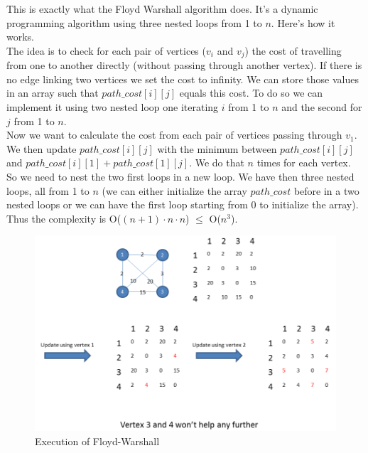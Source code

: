 This is exactly what the Floyd Warshall algorithm does. It's a dynamic programming algorithm using three nested loops from 1 to $n$. Here's how it works.\\

The idea is to check for each pair of vertices ($v_i$ and $v_j$) the cost of travelling from one to another directly (without passing through another vertex). If there is no edge linking two vertices we set the cost to infinity. We can store those values in an array such that $path\_cost[i][j]$ equals this cost. To do so we can implement it using two nested loop one iterating $i$ from 1 to $n$ and the second for $j$ from 1 to $n$.\\
Now we want to calculate the cost from each pair of vertices passing through $v_1$. We then update $path\_cost[i][j]$ with the minimum between $path\_cost[i][j]$ and $path\_cost[i][1]+path\_cost[1][j]$. We do that $n$ times for each vertex. So we need to nest the two first loops in a new loop. We have then three nested loops, all from 1 to $n$ (we can either initialize the array $path\_cost$ before in a two nested loops or we can have the first loop starting from 0 to initialize the array). Thus the complexity is O($(n+1)\cdot n\cdot n$) $\leq$ O($n^3$).\\
\begin{figure}[ht]
  \centering
  \includegraphics[width=1\textwidth]{q1}
  \caption{Execution of Floyd-Warshall}
  \label{fig:q2}
\end{figure}
\clearpage